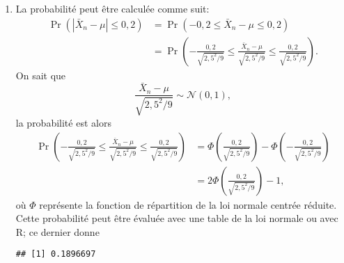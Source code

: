 \begin{solution}{2.22}
\begin{enumerate}
\item La probabilité peut être calculée comme suit:
\begin{align*}
\Pr(|\bar X_n - \mu| \le 0,2) & = \Pr(-0,2 \le \bar X_n - \mu \le 0,2) \\
& = \Pr\left(-\frac{0,2}{\sqrt{2,5^2/9}} \le \frac{\bar X_n - \mu}{\sqrt{2,5^2/9}} \le \frac{0,2}{\sqrt{2,5^2/9}} \right).
\end{align*}
On sait que
$$
\frac{\bar X_n - \mu}{\sqrt{2,5^2/9}} \sim \mathcal{N}(0,1),
$$
la probabilité est alors
\begin{align*}
\Pr\left(-\frac{0,2}{\sqrt{2,5^2/9}} \le \frac{\bar X_n - \mu}{\sqrt{2,5^2/9}} \le \frac{0,2}{\sqrt{2,5^2/9}} \right) &= \Phi\left(\frac{0,2}{\sqrt{2,5^2/9}}\right)-\Phi\left(-\frac{0,2}{\sqrt{2,5^2/9}}\right)\\
& = 2\Phi\left(\frac{0,2}{\sqrt{2,5^2/9}}\right)-1,
\end{align*}
où $\Phi$ représente la fonction de répartition de la loi normale centrée réduite. Cette probabilité peut être évaluée avec une table de la loi normale ou avec \textsf{R}; ce dernier donne
\begin{knitrout}
\color{fgcolor}\begin{kframe}
\begin{alltt}
\hlopt{*}\hlstd{(}\hlopt{/}\hlstd{(}\hlopt{^}\hlopt{/}\hlstd{))}\hlopt{-}
\end{alltt}
\begin{verbatim}
## [1] 0.1896697
\end{verbatim}
\end{kframe}
\end{knitrout}


\end{enumerate}
\end{solution}
